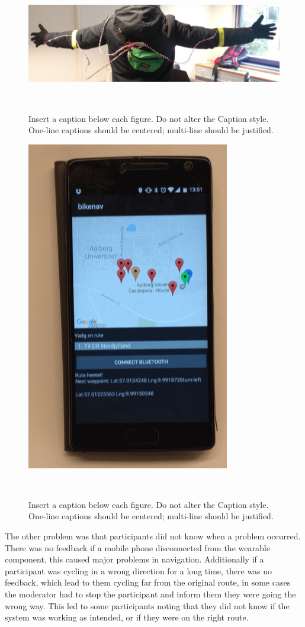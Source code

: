 \documentclass{sigchi}
\begin{document}
\begin{figure}
\centering
  \includegraphics[width=0.9\columnwidth]{figures/enitial_prototype.png}
  \caption{Insert a caption below each figure. Do not alter the
    Caption style.  One-line captions should be centered; multi-line
    should be justified. }~\label{fig:figure1}
\end{figure}
\begin{figure}
\centering
  \includegraphics[width=0.6\columnwidth]{figures/first_app.png}
  \caption{Insert a caption below each figure. Do not alter the
    Caption style.  One-line captions should be centered; multi-line
    should be justified. }~\label{fig:figure1}
\end{figure}
The other problem was that participants did not know when a problem occurred. There was no feedback if a mobile phone disconnected from the wearable component, this caused major problems in navigation. Additionally if a participant was cycling in a wrong direction for a long time, there was no feedback, which lead to them cycling far from the original route, in some cases the moderator had to stop the participant and inform them they were going the wrong way. This led to some participants noting that they did not know if the system was working as intended, or if they were on the right route.
\end{document}
